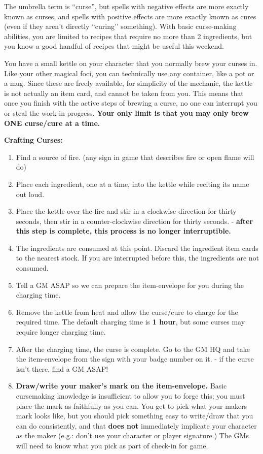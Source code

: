 \documentclass[green]{GL2020}
\begin{document}
\name{\gCursemakingBasic{}}

The umbrella term is “curse”, but spells with negative effects are more exactly known as curses, and spells with positive effects are more exactly known as cures (even if they aren’t directly ``curing’’ something). With basic curse-making abilities, you are limited to recipes that require no more than 2 ingredients, but you know a good handful of recipes that might be useful this weekend.

You have a small kettle on your character that you normally brew your curses in. Like your other magical foci, you can technically use any container, like a pot or a mug. Since these are freely available, for simplicity of the mechanic, the kettle is not actually an item card, and cannot be taken from you. This means that once you finish with the active steps of brewing a curse, no one can interrupt you or steal the work in progress. \textbf{Your only limit is that you may only brew ONE curse/cure at a time.}

\textbf{Crafting Curses:}
\begin{enumerate}
	\item Find a source of fire. (any sign in game that describes fire or open flame will do)
	\item Place each ingredient, one at a time, into the kettle while reciting its name out loud. 
	\item Place the kettle over the fire and stir in a clockwise direction for thirty seconds, then stir in a counter-clockwise direction for thirty seconds. -\textbf{ after this step is complete, this process is no longer interruptible.}
	\item The ingredients are consumed at this point. Discard the ingredient item cards to the nearest stock. If you are interrupted before this, the ingredients are not consumed.
	\item Tell a GM ASAP so we can prepare the item-envelope for you during the charging time.
	\item Remove the kettle from heat and allow the curse/cure to charge for the required time. The default charging time is \textbf{1 hour}, but some curses may require longer charging time.
	\item After the charging time, the curse is complete. Go to the GM HQ and take the item-envelope from the sign with your badge number on it. - if the curse isn’t there, find a GM ASAP!
	\item \textbf{Draw/write your maker's mark on the item-envelope.} Basic cursemaking knowledge is insufficient to allow you to forge this; you must place the mark as faithfully as you can. You get to pick what your makers mark looks like, but you should pick something easy to write/draw that you can do consistently, and that \textbf{does not} immediately implicate your character as the maker (e.g.: don’t use your character or player signature.) The GMs will need to know what you pick as part of check-in for game.
\end{enumerate}
\end{document}
